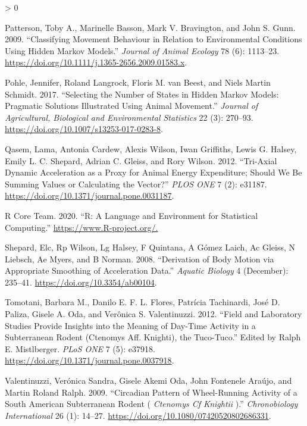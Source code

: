 \documentclass[english,msc,numbers,hidelinks]{coppe}
\newlength{\cslhangindent}
\newenvironment{CSLReferences}[2] %
 {%
  \setlength{\parindent}{0pt}
  \ifodd #1 \everypar{\setlength{\hangindent}{\cslhangindent}}\ignorespaces\fi
  \ifnum #2 > 0
  \setlength{\parskip}{#2\baselineskip}
  \fi
 }%
 {}
\begin{document}
\begin{CSLReferences}{1}{0}
  \leavevmode\hypertarget{ref-patterson2009}{}%
  Patterson, Toby A., Marinelle Basson, Mark V. Bravington, and John S. Gunn. 2009. {``Classifying Movement Behaviour in Relation to Environmental Conditions Using Hidden Markov Models.''} \emph{Journal of Animal Ecology} 78 (6): 1113--23. \url{https://doi.org/10.1111/j.1365-2656.2009.01583.x}.

  \leavevmode\hypertarget{ref-pohle2017}{}%
  Pohle, Jennifer, Roland Langrock, Floris M. van Beest, and Niels Martin Schmidt. 2017. {``Selecting the Number of States in Hidden Markov Models: Pragmatic Solutions Illustrated Using Animal Movement.''} \emph{Journal of Agricultural, Biological and Environmental Statistics} 22 (3): 270--93. \url{https://doi.org/10.1007/s13253-017-0283-8}.

  \leavevmode\hypertarget{ref-qasem2012}{}%
  Qasem, Lama, Antonia Cardew, Alexis Wilson, Iwan Griffiths, Lewis G. Halsey, Emily L. C. Shepard, Adrian C. Gleiss, and Rory Wilson. 2012. {``Tri-Axial Dynamic Acceleration as a Proxy for Animal Energy Expenditure; Should We Be Summing Values or Calculating the Vector?''} \emph{PLOS ONE} 7 (2): e31187. \url{https://doi.org/10.1371/journal.pone.0031187}.

  \leavevmode\hypertarget{ref-rcoreteam2020}{}%
  R Core Team. 2020. {``R: A Language and Environment for Statistical Computing.''} \url{https://www.R-project.org/.}

  \leavevmode\hypertarget{ref-shepard2008}{}%
  Shepard, Elc, Rp Wilson, Lg Halsey, F Quintana, A Gómez Laich, Ac Gleiss, N Liebsch, Ae Myers, and B Norman. 2008. {``Derivation of Body Motion via Appropriate Smoothing of Acceleration Data.''} \emph{Aquatic Biology} 4 (December): 235--41. \url{https://doi.org/10.3354/ab00104}.

  \leavevmode\hypertarget{ref-tomotani2012}{}%
  Tomotani, Barbara M., Danilo E. F. L. Flores, Patrícia Tachinardi, José D. Paliza, Gisele A. Oda, and Verônica S. Valentinuzzi. 2012. {``Field and Laboratory Studies Provide Insights into the Meaning of Day-Time Activity in a Subterranean Rodent (Ctenomys Aff. Knighti), the Tuco-Tuco.''} Edited by Ralph E. Mistlberger. \emph{PLoS ONE} 7 (5): e37918. \url{https://doi.org/10.1371/journal.pone.0037918}.

  \leavevmode\hypertarget{ref-valentinuzzi2009}{}%
  Valentinuzzi, Verónica Sandra, Gisele Akemi Oda, John Fontenele Araújo, and Martin Roland Ralph. 2009. {``Circadian Pattern of Wheel{-}Running Activity of a South American Subterranean Rodent ( {\emph{Ctenomys Cf Knightii}} ).''} \emph{Chronobiology International} 26 (1): 14--27. \url{https://doi.org/10.1080/07420520802686331}.


\end{CSLReferences}
\end{document}
